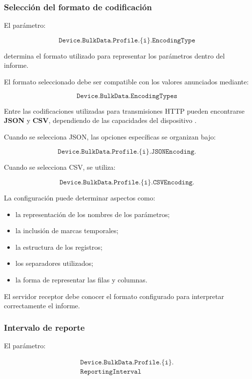 \subsubsection*{Selección del formato de codificación}

El parámetro:

\[
    \texttt{Device.BulkData.Profile.\{i\}.EncodingType}
\]

determina el formato utilizado para representar los parámetros dentro del
informe.

El formato seleccionado debe ser compatible con los valores anunciados
mediante:

\[
    \texttt{Device.BulkData.EncodingTypes}
\]

Entre las codificaciones utilizadas para transmisiones HTTP pueden
encontrarse \textbf{JSON} y \textbf{CSV}, dependiendo de las capacidades
del dispositivo \cite{bbf_tr181}.

Cuando se selecciona JSON, las opciones específicas se organizan bajo:

\[
    \texttt{Device.BulkData.Profile.\{i\}.JSONEncoding.}
\]

Cuando se selecciona CSV, se utiliza:

\[
    \texttt{Device.BulkData.Profile.\{i\}.CSVEncoding.}
\]

La configuración puede determinar aspectos como:

\begin{itemize}
    \item la representación de los nombres de los parámetros;
    \item la inclusión de marcas temporales;
    \item la estructura de los registros;
    \item los separadores utilizados;
    \item la forma de representar las filas y columnas.
\end{itemize}

El servidor receptor debe conocer el formato configurado para interpretar
correctamente el informe.


\subsubsection*{Intervalo de reporte}

El parámetro:

\[
\begin{split}
    \texttt{Device.BulkData.Profile.\{i\}.}\\
    \texttt{ReportingInterval}
\end{split}
\]

